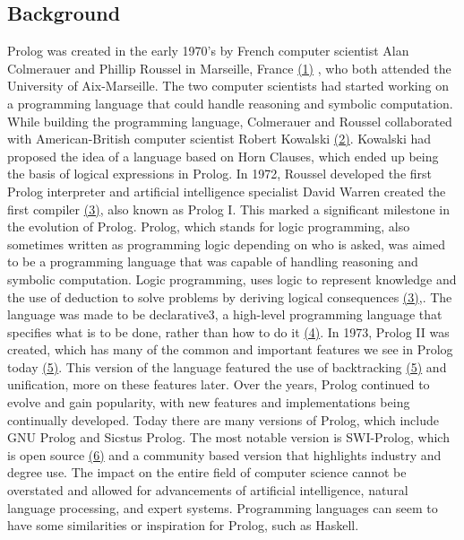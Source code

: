 \documentclass{article}
\theoremstyle{theorem}
\theoremstyle{definition}
\theoremstyle{remark}
\begin{document}
\subsection{Background}
Prolog was created in the early 1970’s by French computer scientist Alan Colmerauer and Phillip Roussel in Marseille, France \href{https://www.cleverism.com/skills-and-tools/prolog/}{(1)}
, who both attended the University of Aix-Marseille. The two computer scientists had started working on a programming language that could handle reasoning and symbolic computation. While building the programming language, Colmerauer and Roussel collaborated with American-British computer scientist Robert Kowalski \href{http://www.doc.ic.ac.uk/~rak/papers/the.pdf}{(2)}. Kowalski had proposed the idea of a language based on Horn Clauses, which ended up being the basis of logical expressions in Prolog. In 1972, Roussel developed the first Prolog interpreter and artificial intelligence specialist David Warren created the first compiler \href{https://www.mta.ca/~rrosebru/oldcourse/371199/prolog/history.html#:~:text=1972}{(3)}, also known as Prolog I. This marked a significant milestone in the evolution of Prolog. Prolog, which stands for logic programming, also sometimes written as programming logic depending on who is asked, was aimed to be a programming language that was capable of handling reasoning and symbolic computation. Logic programming, uses logic to represent knowledge and the use of deduction to solve problems by deriving logical consequences \href{https://www.mta.ca/~rrosebru/oldcourse/371199/prolog/history.html#:~:text=1972}{(3)},. The language was made to be declarative3, a high-level programming language that specifies what is to be done, rather than how to do it \href{https://www.britannica.com/technology/declarative-language}{(4)}. In 1973, Prolog II was created, which has many of the common and important features we see in Prolog today \href{https://dl.acm.org/doi/pdf/10.1145/234286.1057820}{(5)}. This version of the language featured the use of backtracking \href{https://dl.acm.org/doi/pdf/10.1145/234286.1057820}{(5)} and unification, more on these features later. Over the years, Prolog continued to evolve and gain popularity, with new features and implementations being continually developed. Today there are many versions of Prolog, which include GNU Prolog and Sicstus Prolog. The most notable version is SWI-Prolog, which is open source \href{https://www.swi-prolog.org/}{(6)} and a community based version that highlights industry and degree use. The impact on the entire field of computer science cannot be overstated and allowed for advancements of artificial intelligence, natural language processing, and expert systems. Programming languages can seem to have some similarities or inspiration for Prolog, such as Haskell.
\end{document}
